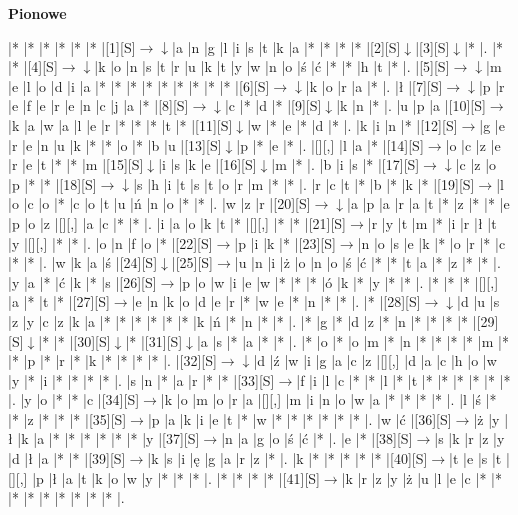 \documentclass[11pt]{article}
\newcommand\drarr{$\rightarrow \!\!\!\!\! \downarrow$}
\newcommand\rarr{$\rightarrow$}
\newcommand\darr{$\downarrow$}
\begin{document}
\begin{PuzzleClues}{\textbf{Pionowe}\\}
\end{PuzzleClues}\newpage%

\noindent\begin{Puzzle}{22}{25}|*	|*	|*	|*	|*	|*	|[1][S]\drarr	|a	|n	|g	|l	|i	|s	|t	|k	|a	|*	|*	|*	|*	|[2][S]\darr	|[3][S]\darr	|*	|.
|*	|*	|[4][S]\drarr	|k	|o	|n	|s	|t	|r	|u	|k	|t	|y	|w	|n	|o	|ś	|ć	|*	|*	|h	|t	|*	|.
|[5][S]\drarr	|m	|e	|l	|o	|d	|i	|a	|*	|*	|*	|*	|*	|*	|*	|*	|*	|[6][S]\drarr	|k	|o	|r	|a	|*	|.
|ł	|[7][S]\drarr	|p	|r	|e	|f	|e	|r	|e	|n	|c	|j	|a	|*	|[8][S]\drarr	|c	|*	|d	|*	|[9][S]\darr	|k	|n	|*	|.
|u	|p	|a	|[10][S]\rarr	|k	|a	|w	|a	|l	|e	|r	|*	|*	|*	|t	|*	|[11][S]\darr	|w	|*	|e	|*	|d	|*	|.
|k	|i	|n	|*	|[12][S]\rarr	|g	|e	|r	|e	|n	|u	|k	|*	|*	|o	|*	|b	|u	|[13][S]\darr	|p	|*	|e	|*	|.
|[][,]{ }	|l	|a	|*	|[14][S]\rarr	|o	|c	|z	|e	|r	|e	|t	|*	|*	|m	|[15][S]\darr	|i	|s	|k	|e	|[16][S]\darr	|m	|*	|.
|b	|i	|s	|*	|[17][S]\drarr	|c	|z	|o	|p	|*	|*	|[18][S]\drarr	|s	|h	|i	|t	|s	|t	|o	|r	|m	|*	|*	|.
|r	|c	|t	|*	|b	|*	|k	|*	|[19][S]\rarr	|l	|o	|c	|o	|*	|c	|o	|t	|u	|ń	|n	|o	|*	|*	|.
|w	|z	|r	|[20][S]\drarr	|a	|p	|a	|r	|a	|t	|*	|z	|*	|*	|e	|p	|o	|z	|[][,]{ }	|a	|c	|*	|*	|.
|i	|a	|o	|k	|t	|*	|[][,]{ }	|*	|*	|[21][S]\rarr	|r	|y	|t	|m	|*	|i	|r	|ł	|t	|y	|[][,]{ }	|*	|*	|.
|o	|n	|f	|o	|*	|[22][S]\rarr	|p	|i	|k	|*	|[23][S]\rarr	|n	|o	|s	|e	|k	|*	|o	|r	|*	|c	|*	|*	|.
|w	|k	|a	|ś	|[24][S]\darr	|[25][S]\rarr	|u	|n	|i	|ż	|o	|n	|o	|ś	|ć	|*	|*	|t	|a	|*	|z	|*	|*	|.
|y	|a	|*	|ć	|k	|*	|s	|[26][S]\rarr	|p	|o	|w	|i	|e	|w	|*	|*	|*	|ó	|k	|*	|y	|*	|*	|.
|*	|*	|*	|[][,]{ }	|a	|*	|t	|*	|[27][S]\rarr	|e	|n	|k	|o	|d	|e	|r	|*	|w	|e	|*	|n	|*	|*	|.
|*	|[28][S]\drarr	|d	|u	|s	|z	|y	|c	|z	|k	|a	|*	|*	|*	|*	|*	|*	|k	|ń	|*	|n	|*	|*	|.
|*	|g	|*	|d	|z	|*	|n	|*	|*	|*	|*	|[29][S]\darr	|*	|*	|[30][S]\darr	|*	|[31][S]\darr	|a	|s	|*	|a	|*	|*	|.
|*	|o	|*	|o	|m	|*	|n	|*	|*	|*	|*	|m	|*	|*	|p	|*	|r	|*	|k	|*	|*	|*	|*	|.
|[32][S]\drarr	|d	|ź	|w	|i	|g	|a	|c	|z	|[][,]{ }	|d	|a	|c	|h	|o	|w	|y	|*	|i	|*	|*	|*	|*	|.
|s	|n	|*	|a	|r	|*	|*	|[33][S]\rarr	|f	|i	|l	|c	|*	|*	|l	|*	|t	|*	|*	|*	|*	|*	|*	|.
|y	|o	|*	|*	|c	|[34][S]\rarr	|k	|o	|m	|o	|r	|a	|[][,]{ }	|m	|i	|n	|o	|w	|a	|*	|*	|*	|*	|.
|l	|ś	|*	|*	|z	|*	|*	|*	|[35][S]\rarr	|p	|a	|k	|i	|e	|t	|*	|w	|*	|*	|*	|*	|*	|*	|.
|w	|ć	|[36][S]\rarr	|ż	|y	|ł	|k	|a	|*	|*	|*	|*	|*	|*	|y	|[37][S]\rarr	|n	|a	|g	|o	|ś	|ć	|*	|.
|e	|*	|[38][S]\rarr	|s	|k	|r	|z	|y	|d	|ł	|a	|*	|*	|[39][S]\rarr	|k	|s	|i	|ę	|g	|a	|r	|z	|*	|.
|k	|*	|*	|*	|*	|*	|[40][S]\rarr	|t	|e	|s	|t	|[][,]{ }	|p	|ł	|a	|t	|k	|o	|w	|y	|*	|*	|*	|.
|*	|*	|*	|*	|[41][S]\rarr	|k	|r	|z	|y	|ż	|u	|l	|e	|c	|*	|*	|*	|*	|*	|*	|*	|*	|*	|.\end{Puzzle}
\end{document}
